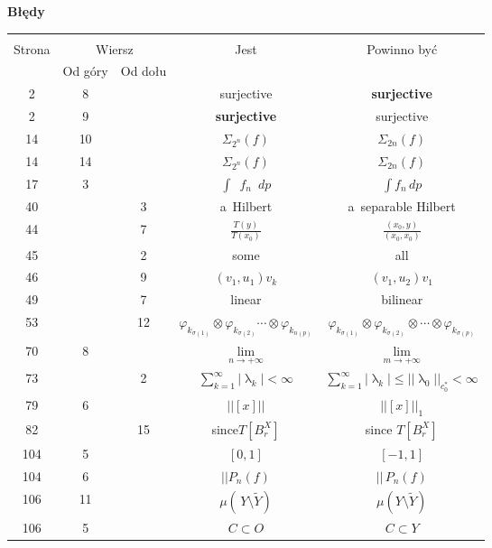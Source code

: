 \documentclass[a4paper,11pt]{article}
\newcommand{\fr}{\frac}
\newcommand{\wt}{\widetilde}
\newcommand{\ra}{\rightarrow}
\newcommand{\la}{\uplambda}
\newcommand{\vp}{\varphi}
\newcommand{\si}{\sigma}
\newcommand{\Si}{\Sigma}
\newcommand{\subs}{\subset}
\newcommand{\setm}{\setminus}
\newcommand{\ot}{\otimes}
\newcommand{\Lim}{\lim\limits}
\newcommand{\Sum}{\sum\limits}
\newcommand{\Int}{\int\limits}
\newcommand{\IntCaD}[2] { \Int #1 \, d#2 } %
\providecommand{\absj}[1]{\lvert #1 \rvert}
\newcommand{\norm}[1]{\left|\left| #1 \right|\right|}
\newcommand{\tb}{\textbf}
\newcommand{\Center}[1]{\begin{center} #1 \end{center}}
\newcommand{\CenterTB}[1]{\Center{\tb{#1}}}
\begin{document}
\CenterTB{Błędy}
\begin{center}
  \begin{tabular}{|c|c|c|c|c|}
    \hline
    & \multicolumn{2}{c|}{} & & \\
    Strona & \multicolumn{2}{c|}{Wiersz}& Jest & Powinno być \\ \cline{2-3}
    & Od góry & Od dołu &  &  \\ \hline
    2 & 8 & & surjective & \tb{surjective} \\
    2 & 9 & & \tb{surjective} & surjective \\
    14 & 10 & & $\Si_{ 2^{ n } }( f )$ & $\Si_{ 2 n }( f )$ \\
    14 & 14 & & $\Si_{ 2^{ n } }( f )$ & $\Si_{ 2 n }( f )$ \\
    17 & 3 & & $\int \;\: f_{ n } \;\: dp$ & $\IntCaD{ f_{ n } }{ p }$ \\
    40 & & 3 & a~Hilbert & a~separable Hilbert \\
    44 & & 7 & $\fr{ T( y ) }{ T( x_{ 0 } ) }$
           & $\fr{ ( x_{ 0 }, y ) }{ ( x_{ 0 }, x_{ 0 } ) }$ \\
    45 & & 2 & some & all \\
    46 & & 9 & $(v_{ 1 }, u_{ 1 } ) v_{ k }$ & $(v_{ 1 }, u_{ 2 } ) v_{ 1 }$ \\
    49 & & 7 & linear & bilinear \\
    53 & & 12 & $\vp_{ k_{ \si( 1 ) } } \ot \vp_{ k_{ \si( 2 ) } } \cdots
                \ot \vp_{ k_{ n( p ) } }$
           & $\vp_{ k_{ \si( 1 ) } } \ot \vp_{ k_{ \si( 2 ) } } \ot \cdots
             \ot \vp_{ k_{ \si( p ) } }$ \\
    70 & 8 & & $\Lim_{ n \ra +\infty }$ & $\Lim_{ m \ra +\infty }$ \\ %
    73 & & 2 & $\Sum_{ k = 1 }^{ \infty } \absj{ \la_{ k } } < \infty$
           & $\Sum_{ k = 1 }^{ \infty } \absj{ \la_{ k } } \leq
             \norm{ \la_{ 0 } }_{ c_{ 0 }^{ * } } < \infty$ \\
    79 & 6 & & $\norm{ [x] }$ & $\norm{ [x] }_{ 1 }$ \\
    82 & & 15 & since$T[ B_{ r }^{ X } ]$ & since $T[ B_{ r }^{ X } ]$ \\
    104 & 5 & & $[ 0, 1 ]$ & $[ -1, 1 ]$ \\
    104 & 6 & & $||P_{ n }( f )$ & $|| \, P_{ n }( f )$ \\
    106 & 11 & & $\mu( \, Y \setm \wt{ Y } )$
           & $\mu( Y \setm \wt{ Y } )$ \\
    106 & 5 & & $C \subs O$ & $C \subs Y$ \\

\end{tabular}
\end{center}
\end{document}
